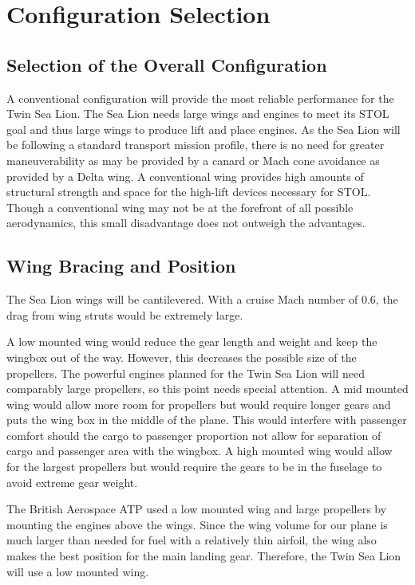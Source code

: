 \documentclass[conf]{new-aiaa}
\begin{document}
\section{Configuration Selection}
\subsection{Selection of the Overall Configuration}
A conventional configuration will provide the most reliable performance for the Twin Sea Lion. The Sea Lion needs large wings and engines to meet its STOL goal and thus large wings to produce lift and place engines. As the Sea Lion will be following a standard transport mission profile, there is no need for greater maneuverability as may be provided by a canard or Mach cone avoidance as provided by a Delta wing. A conventional wing provides high amounts of structural strength and space for the high-lift devices necessary for STOL. Though a conventional wing may not be at the forefront of all possible aerodynamics, this small disadvantage does not outweigh the advantages.

\subsection{Wing Bracing and Position}
The Sea Lion wings will be cantilevered. With a cruise Mach number of 0.6, the drag from wing struts would be extremely large.

A low mounted wing would reduce the gear length and weight and keep the wingbox out of the way. However, this decreases the possible size of the propellers. The powerful engines planned for the Twin Sea Lion will need comparably large propellers, so this point needs special attention. A mid mounted wing would allow more room for propellers but would require longer gears and puts the wing box in the middle of the plane. This would interfere with passenger comfort should the cargo to passenger proportion not allow for separation of cargo and passenger area with the wingbox. A high mounted wing would allow for the largest propellers but would require the gears to be in the fuselage to avoid extreme gear weight.

The British Aerospace ATP used a low mounted wing and large propellers by mounting the engines above the wings. Since the wing volume for our plane is much larger than needed for fuel with a relatively thin airfoil, the wing also makes the best position for the main landing gear. Therefore, the Twin Sea Lion will use a low mounted wing.
\end{document}
